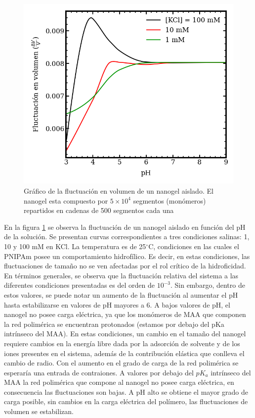 	\begin{figure}
		\centering
		\includegraphics[width=0.45\linewidth]{Figures/graph-mc/fluct-pH.png}
		\caption{Gr\'afico de la fluctuaci\'on en volumen de un nanogel aislado. El nanogel esta compuesto por $5\times 10^4$ segmentos (mon\'omeros) repartidos en cadenas de 500 segmentos cada una}
		\label{fig:mc:flut-pH}
	\end{figure}
	
	En la figura \ref{fig:mc:flut-pH} se observa la fluctuaci\'on de un nanogel aislado en funci\'on del pH de la soluci\'on. Se presentan curvas correspondientes a tres condiciones salinas: 1, 10 y 100 mM en KCl. La temperatura es de 25$^\circ$C, condiciones en las cuales el PNIPAm posee un comportamiento hidrof\'ilico. Es decir, en estas condiciones, las fluctuaciones de tama\~no no se ven afectadas por el rol cr\'itico de la hidroficidad.
	En t\'erminos generales, se observa que la fluctuaci\'on relativa del sistema a las diferentes condiciones presentadas es del orden de $10^{-3}$. Sin embargo, dentro de estos valores, se puede notar un aumento de la fluctuaci\'on al aumentar el pH hasta estabilizarse en valores de pH mayores a 6.
	A bajos valores de pH, el nanogel no posee carga el\'ectrica, ya que los mon\'omeros de MAA que componen la red polim\'erica se encuentran protonados (estamos por debajo del pKa intr\'inseco del MAA). En estas condiciones, un cambio en el tama\~no del nanogel requiere cambios en la energ\'ia libre  dada por la adsorci\'on de solvente y de los iones presentes en el sistema, adem\'as de la contribuci\'on el\'astica que conlleva el cambio de radio.
	Con el aumento en el grado de carga de la red polim\'erica se esperar\'ia una entrada de contraiones. A valores por debajo del $pK_a$ intr\'inseco del MAA la red polim\'erica que compone al nanogel no posee carga el\'ectrica, en consecuencia las fluctuaciones son bajas. A pH alto se obtiene el mayor grado de carga posible, sin cambios en la carga el\'ectrica del pol\'imero, las fluctuaciones de volumen se estabilizan.
	

